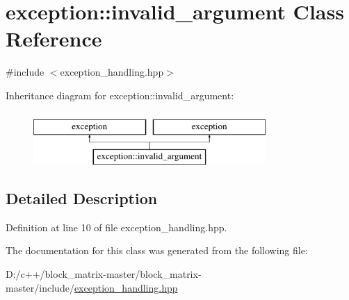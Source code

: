 \hypertarget{classexception_1_1invalid__argument}{}\section{exception\+:\+:invalid\+\_\+argument Class Reference}
\label{classexception_1_1invalid__argument}


{\ttfamily \#include $<$exception\+\_\+handling.\+hpp$>$}

Inheritance diagram for exception\+:\+:invalid\+\_\+argument\+:\begin{figure}[H]
\begin{center}
\leavevmode
\includegraphics[height=2.000000cm]{classexception_1_1invalid__argument}
\end{center}
\end{figure}


\subsection{Detailed Description}


Definition at line 10 of file exception\+\_\+handling.\+hpp.



The documentation for this class was generated from the following file\+:\begin{DoxyCompactItemize}
\item 
D\+:/c++/block\+\_\+matrix-\/master/block\+\_\+matrix-\/master/include/\mbox{\hyperlink{include_2exception__handling_8hpp}{exception\+\_\+handling.\+hpp}}\end{DoxyCompactItemize}
